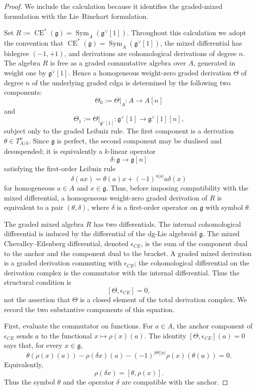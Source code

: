\documentclass[11pt,reqno,a4paper,dvipsnames,x11names]{amsart}
\numberwithin{equation}{section}
\theoremstyle{plain}
\theoremstyle{definition}
\theoremstyle{remark}
\DeclareMathOperator{\Sym}{Sym}
\DeclareMathOperator{\CE}{CE}
\newcommand{\kk}{k}
\newcommand{\g}{\mathfrak g}
\newcommand{\from}{\colon}
\begin{document}
\begin{proof}
We include the calculation because it identifies the graded-mixed formulation with the Lie--Rinehart formulation.

Set
 $
 R:=\CE^*(\g)=\Sym_A(\g^\vee[1]).
$
Throughout this calculation we adopt the convention that \(\CE^*(\g)=\Sym_A(\g^\vee[1])\), the mixed differential has bidegree \((-1,+1)\), and derivations are cohomological derivations of degree \(n\). The algebra \(R\) is free as a graded commutative algebra over \(A\), generated in weight one by \(\g^\vee[1]\). Hence a homogeneous weight-zero graded derivation \(\Theta\) of degree \(n\) of the underlying graded cdga is determined by the following two components:
\[
 \Theta_0:=\Theta|_A\from A\longrightarrow A[n]
\]
and
\[
 \Theta_1:=\Theta|_{\g^\vee[1]}\from
 \g^\vee[1]\longrightarrow \g^\vee[1][n],
\]
subject only to the graded Leibniz rule. The first component is a derivation \(\theta\in T_{A/\kk}^n\). Since \(\g\) is perfect, the second component may be dualised and desuspended; it is equivalently a \(\kk\)-linear operator
\[
 \delta\from\g\longrightarrow\g[n]
\]
satisfying the first-order Leibniz rule
\[
 \delta(ax)=\theta(a)x+(-1)^{n|a|}a\delta(x)
\]
for homogeneous \(a\in A\) and \(x\in\g\). Thus, before imposing compatibility with the mixed differential, a homogeneous weight-zero graded derivation of \(R\) is equivalent to a pair \((\theta,\delta)\), where \(\delta\) is a first-order operator on \(\g\) with symbol \(\theta\).

The graded mixed algebra \(R\) has two differentials. The internal cohomological differential is induced by the differential of the dg-Lie algebroid \(\g\). The mixed Chevalley--Eilenberg differential, denoted \(\epsilon_{CE}\), is the sum of the component dual to the anchor and the component dual to the bracket. A graded mixed derivation is a graded derivation commuting with \(\epsilon_{CE}\); the cohomological differential on the derivation complex is the commutator with the internal differential. Thus the structural condition is
\[
 [\Theta,\epsilon_{CE}]=0,
\]
not the assertion that \(\Theta\) is a closed element of the total derivation complex. We record the two substantive components of this equation.

First, evaluate the commutator on functions. For \(a\in A\), the anchor component of \(\epsilon_{CE}\) sends \(a\) to the functional \(x\mapsto \rho(x)(a)\). The identity \([\Theta,\epsilon_{CE}](a)=0\) says that, for every \(x\in\g\),
\[
 \theta(\rho(x)(a))-
\rho(\delta x)(a)-(-1)^{|\Theta||x|}\rho(x)(\theta(a))=0.
\]
Equivalently,
\[
 \rho(\delta x)=[\theta,\rho(x)] .
\]
Thus the symbol \(\theta\) and the operator \(\delta\) are compatible with the anchor.


\end{proof}
\end{document}
